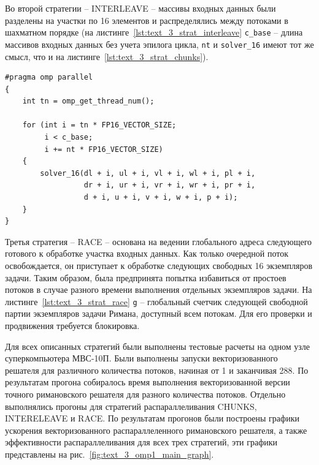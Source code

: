 Во второй стратегии -- INTERLEAVE -- массивы входных данных были разделены на участки по 16 элементов и распределялись между потоками в шахматном порядке (на листинге~\ref{lst:text_3_strat_interleave} \texttt{c\_base} -- длина массивов входных данных без учета эпилога цикла, \texttt{nt} и \texttt{solver\_16} имеют тот же смысл, что и на листинге~\ref{lst:text_3_strat_chunks}).

\begin{singlespace}
\begin{lstlisting}[caption={Распараллеливание римановского решателя с помощью стратегии INTERLEAVE.},label={lst:text_3_strat_interleave}]
#pragma omp parallel
{
    int tn = omp_get_thread_num();

    for (int i = tn * FP16_VECTOR_SIZE;
         i < c_base;
         i += nt * FP16_VECTOR_SIZE)
    {
        solver_16(dl + i, ul + i, vl + i, wl + i, pl + i,
                  dr + i, ur + i, vr + i, wr + i, pr + i,
                  d + i, u + i, v + i, w + i, p + i);
    }
}
\end{lstlisting}
\end{singlespace}

Третья стратегия -- RACE -- основана на ведении глобального адреса следующего готового к обработке участка входных данных.
Как только очередной поток освобождается, он приступает к обработке следующих свободных 16 экземпляров задачи.
Таким образом, была предпринята попытка избавиться от простоев потоков в случае разного времени выполнения отдельных экземпляров задачи.
На листинге~\ref{lst:text_3_strat_race} \texttt{g} -- глобальный счетчик следующей свободной партии экземпляров задачи Римана, доступный всем потокам.
Для его проверки и продвижения требуется блокировка.

Для всех описанных стратегий были выполнены тестовые расчеты на одном узле суперкомпьютера МВС-10П.
Были выполнены запуски векторизованного решателя для различного количества потоков, начиная от 1 и заканчивая 288.
По результатам прогона собиралось время выполнения векторизованной версии точного римановского решателя для разного количества потоков.
Отдельно выполнялись прогоны для стратегий распараллеливания CHUNKS, INTERELEAVE и RACE.
По результатам прогонов были построены графики ускорения векторизованного распараллеленного римановского решателя, а также эффективности распараллеливания для всех трех стратегий, эти графики представлены на рис.~\ref{fig:text_3_omp1_main_graph}.

